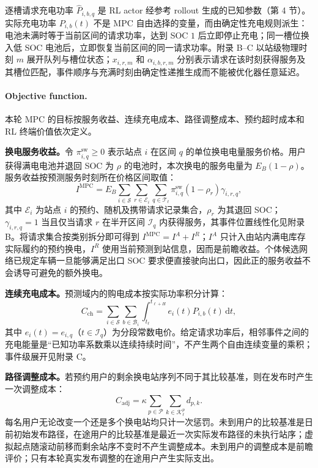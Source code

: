 \documentclass[12pt,a4paper,UTF8]{ctexart}
\begin{document}
逐槽请求充电功率 $\widehat P_{i,b,q}$ 是 RL actor 经参考 rollout 生成的已知参数（第 4 节）。实际充电功率 $P_{i,b}(t)$ 不是 MPC 自由选择的变量，而由确定性充电规则派生：电池未满时等于当前区间的请求功率，达到 SOC $1$ 后立即停止充电；同一槽位换入低 SOC 电池后，立即恢复当前区间的同一请求功率。附录 B--C 以站级物理时刻 $m$ 展开队列与槽位状态；$x_{i,r,m}$ 和 $\alpha_{i,b,r,m}$ 分别表示请求在该时刻获得服务及其槽位匹配，事件顺序与充满时刻由确定性递推生成而不能被优化器任意延迟。

\paragraph{Objective function.}
本轮 MPC 的目标按服务收益、连续充电成本、路径调整成本、预约超时成本和 RL 终端价值依次定义。

\textbf{换电服务收益。}令 $\pi_{i,q}^{\mathrm{sw}}\ge0$ 表示站点 $i$ 在区间 $q$ 的单位换电电量服务价格。用户获得满电电池并退回 SOC 为 $\rho$ 的电池时，本次换电的服务电量为 $E_B(1-\rho)$。服务收益按预测服务时刻所在价格区间取值：
\begin{equation}
I^{\mathrm{MPC}}
=E_B\sum_{i\in\mathcal S}
\sum_{r\in\mathcal E_i}
\sum_{q\in\mathcal T_\ell}
\pi_{i,q}^{\mathrm{sw}}(1-\rho_r)\gamma_{i,r,q},
\label{eq:income}
\end{equation}
其中 $\mathcal E_i$ 为站点 $i$ 的预约、随机及携带请求记录集合，$\rho_r$ 为其退回 SOC；$\gamma_{i,r,q}=1$ 当且仅当请求 $r$ 在半开区间 $\mathcal I_q$ 内获得服务，其事件位置线性化见附录 B。将请求集合按类别拆分即可得到 $I^{\mathrm{MPC}}=I^A+I^R$；$I^A$ 只计入由站内满电库存实际履约的预约换电，$I^R$ 使用当前预测到站信息，因而是前瞻收益。个体候选网络已规定车辆一旦能够满足出口 SOC 要求便直接驶向出口，因此正的服务收益不会诱导可避免的额外换电。

\textbf{连续充电成本。}预测域内的购电成本按实际功率积分计算：
\begin{equation}
C_{\mathrm{ch}}
=
\sum_{i\in\mathcal S}
\sum_{b\in\mathcal B_i}
\int_{t_\ell}^{t_{\ell+H}}
e_i(t)P_{i,b}(t)\,\mathrm dt,
\label{eq:chargingcost}
\end{equation}
其中 $e_i(t)=e_{i,q}$（$t\in\mathcal I_q$）为分段常数电价。给定请求功率后，相邻事件之间的充电能量是“已知功率系数乘以连续持续时间”，不产生两个自由连续变量的乘积；事件级展开见附录 C。

\textbf{路径调整成本。}若预约用户的剩余换电站序列不同于其比较基准，则在发布时产生一次调整成本：
\begin{equation}
C_{\mathrm{adj}}
=
\kappa
\sum_{p\in\mathcal P}
\sum_{k\in\mathcal K_\ell^p}
d_{p,k}.
\label{eq:adjustment_cost}
\end{equation}
每名用户无论改变一个还是多个换电站均只计一次惩罚。未到用户的比较基准是日前初始发布路径，在途用户的比较基准是最近一次实际发布路径的未执行站序；虚拟起点随滚动前移而剩余站序不变时不产生调整成本。未到用户的调整成本是前瞻评价；只有本轮真实发布调整的在途用户产生实际支出。
\end{document}
